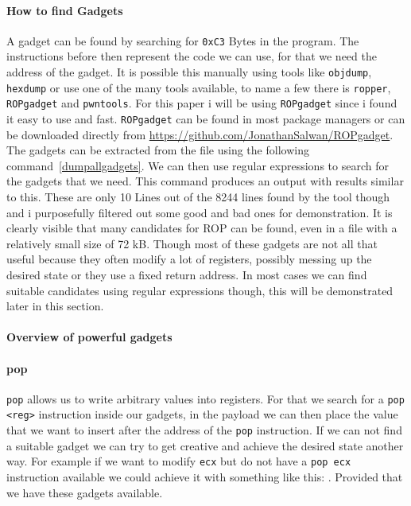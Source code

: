 \documentclass[journal=tosc,submission, notanonymous]{iacrtrans}
\begin{document}
\paragraph{How to find Gadgets}
A gadget can be found by searching for \Verb+0xC3+ Bytes in the program. The instructions before then represent the code we can use, for that we need the address of the gadget. It is possible this manually using tools like \Verb+objdump+, \Verb+hexdump+ or use one of the many tools available, to name a few there is \Verb+ropper+, \Verb+ROPgadget+ and \Verb+pwntools+. For this paper i will be using \Verb+ROPgadget+ since i found it easy to use and fast. \Verb+ROPgadget+ can be found in most package managers or can be downloaded directly from \url{https://github.com/JonathanSalwan/ROPgadget}. The gadgets can be extracted from the file using the following command~\cref{dumpallgadgets}. We can then use regular expressions to search for the gadgets that we need.
This command produces an output with results similar to this.
These are only 10 Lines out of the 8244 lines found by the tool though and i purposefully filtered out some good and bad ones for demonstration. It is clearly visible that many candidates for ROP can be found, even in a file with a relatively small size of 72 kB. Though most of these gadgets are not all that useful because they often modify a lot of registers, possibly messing up the desired state or they use a fixed return address. In most cases we can find suitable candidates using regular expressions though, this will be demonstrated later in this section.
\paragraph{Overview of powerful gadgets}
\paragraph{pop}
\Verb+pop+ allows us to write arbitrary values into registers. For that we search for a \Verb+pop <reg>+ instruction inside our gadgets, in the payload we can then place the value that we want to insert after the address of the \Verb+pop+ instruction. If we can not find a suitable gadget we can try to get creative and achieve the desired state another way. For example if we want to modify \Verb+ecx+ but do not have a \Verb+pop ecx+ instruction available we could achieve it with something like this: . Provided that we have these gadgets available.
\end{document}
